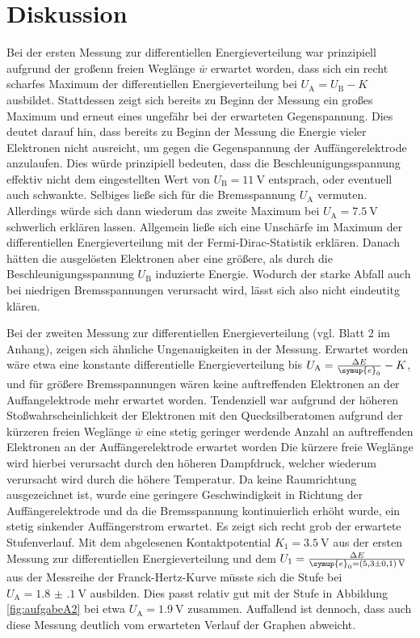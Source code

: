 \section{Diskussion}
\label{sec:Diskussion}
Bei der ersten Messung zur differentiellen Energieverteilung war prinzipiell aufgrund der großenn freien Weglänge $\bar{w}$ erwartet worden, dass sich ein recht scharfes Maximum der differentiellen Energieverteilung bei $U_\mathrm{A}=U_\mathrm{B}-K$ ausbildet. Stattdessen zeigt sich bereits zu Beginn der Messung ein großes Maximum und erneut eines ungefähr bei der erwarteten Gegenspannung. Dies deutet darauf hin, dass bereits zu Beginn der Messung die Energie vieler Elektronen nicht ausreicht, um gegen die Gegenspannung der Auffängerelektrode anzulaufen. Dies würde prinzipiell bedeuten, dass die Beschleunigungsspannung effektiv nicht dem eingestellten Wert von $U_\mathrm{B}=\SI{11}{\volt}$ entsprach, oder eventuell auch schwankte.
Selbiges ließe sich für die Bremsspannung $U_\mathrm{A}$ vermuten. Allerdings würde sich dann wiederum das zweite Maximum bei $U_\mathrm{A}=\SI{7.5}{\volt}$ schwerlich erklären lassen.
Allgemein ließe sich eine Unschärfe im Maximum der differentiellen Energieverteilung mit der Fermi-Dirac-Statistik erklären. Danach hätten die ausgelösten Elektronen aber eine größere, als durch die Beschleunigungsspannung $U_\mathrm{B}$ induzierte Energie. Wodurch der starke Abfall auch bei niedrigen Bremsspannungen verursacht wird, lässt sich also nicht eindeutitg klären.

Bei der zweiten Messung zur differentiellen Energieverteilung (vgl. Blatt 2 im Anhang), zeigen sich ähnliche Ungenauigkeiten in der Messung. Erwartet worden wäre etwa eine konstante differentielle Energieverteilung bis $U_\mathrm{A}=\frac{\Delta E}{\symup{e}_0}-K$, und für größere Bremsspannungen wären keine auftreffenden Elektronen an der Auffangelektrode mehr erwartet worden.
Tendenziell war aufgrund der höheren Stoßwahrscheinlichkeit der Elektronen mit den Quecksilberatomen aufgrund der kürzeren freien Weglänge $\bar{w}$
eine stetig geringer werdende Anzahl an auftreffenden Elektronen an der Auffängerelektrode erwartet worden
Die kürzere freie Weglänge wird hierbei verursacht durch den höheren Dampfdruck, welcher wiederum verursacht wird durch die höhere Temperatur.
Da keine Raumrichtung ausgezeichnet ist, wurde eine geringere Geschwindigkeit in Richtung der Auffängerelektrode und da die Bremsspannung kontinuierlich erhöht wurde, ein stetig sinkender Auffängerstrom erwartet.
Es zeigt sich recht grob der erwartete Stufenverlauf.
Mit dem abgelesenen Kontaktpotential $K_1=\SI{3.5}{\volt}$ aus der ersten Messung zur differentiellen Energieverteilung und dem $U_1=\frac{\Delta E}{\symup{e}_0=\SI{5.3(1)}{\volt}}$ aus der Messreihe der Franck-Hertz-Kurve müsste sich die Stufe bei $U_\mathrm{A}=\SI{1.8(1)}{\volt}$ ausbilden.
Dies passt relativ gut mit der Stufe in Abbildung \ref{fig:aufgabeA2} bei etwa $U_\mathrm{A}=\SI{1.9}{\volt}$ zusammen.
Auffallend ist dennoch, dass auch diese Messung deutlich vom erwarteten Verlauf der Graphen abweicht.

